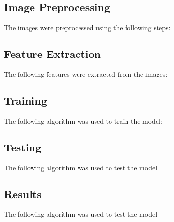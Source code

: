 \documentclass{article}
\begin{document}
    \subsection*{Image Preprocessing}
    The images were preprocessed using the following steps:

    \subsection*{Feature Extraction}
    The following features were extracted from the images:

    \subsection*{Training}
    The following algorithm was used to train the model:
    

    \subsection*{Testing}
    The following algorithm was used to test the model:
    
    \subsection*{Results}
    The following algorithm was used to test the model:
    
\end{document}
